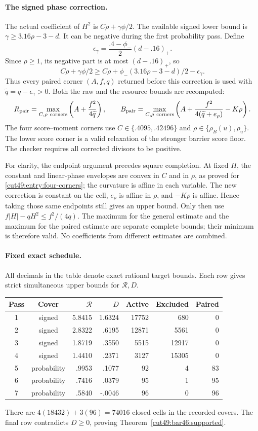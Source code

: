\documentclass[11pt,a4paper]{article}
\numberwithin{equation}{section}
\theoremstyle{definition}
\theoremstyle{remark}
\begin{document}
\paragraph{The signed phase correction.}
The actual coefficient of $H^2$ is $C\rho+\gamma\phi/2$.
The available signed lower bound is $\gamma\ge3.16\rho-3-d$.
It can be negative during the first probability pass. Define
\[
 \epsilon_\gamma=\frac{.4-\phi_-}{2}(d-.16)_+.
\]
Since $\rho\ge1$, its negative part is at most $(d-.16)_+$, so
\begin{equation}\label{cut49:bar46:phase}
 C\rho+\gamma\phi/2
 \ge C\rho+\phi_-(3.16\rho-3-d)/2-\epsilon_\gamma.
\end{equation}
Thus every paired corner $(A,f,q)$ returned before this correction
is used with $\widetilde q=q-\epsilon_\gamma>0$. Both the raw and the
resource bounds are recomputed:
\[
 R_{\rm pair}=\max_{C,\rho\ {\rm corners}}
       \left(A+\frac{f^2}{4\widetilde q}\right),\qquad
 B_{\rm pair}=\max_{C,\rho\ {\rm corners}}
       \left(A+\frac{f^2}{4(\widetilde q+e_\rho)}-K\rho\right).
\]
The four score--moment corners use $C\in\{.4095,.42496\}$ and
$\rho\in\{\rho_B(u),\rho_u\}$. The lower score corner is a valid
relaxation of the stronger barrier score floor. The checker requires
all corrected divisors to be positive.

For clarity, the endpoint argument precedes square completion. At fixed
$H$, the constant and linear-phase envelopes are convex in $C$ and in
$\rho$, as proved for \eqref{cut49:entry:four-corners}; the curvature is affine in each variable.
The new correction is constant on the cell, $e_\rho$ is affine in
$\rho$, and $-K\rho$ is affine. Hence taking those same endpoints
still gives an upper bound. Only then use
$f|H|-qH^2\le f^2/(4q)$. The maximum for the general estimate and the
maximum for the paired estimate are separate complete bounds; their
minimum is therefore valid. No coefficients from different estimates
are combined.

\paragraph{Fixed exact schedule.}
All decimals in the table denote exact rational target bounds. Each
row gives strict simultaneous upper bounds for $\mathcal R,D$.
\begin{center}\small
\begin{tabular}{c|c|r|r|r|r|r}
Pass&Cover&$\mathcal R$&$D$&Active&Excluded&Paired\\\hline
1&signed&5.8415&1.6324&17752&680&0\\
2&signed&2.8322&.6195&12871&5561&0\\
3&signed&1.8719&.3550&5515&12917&0\\
4&signed&1.4410&.2371&3127&15305&0\\
5&probability&.9953&.1077&92&4&83\\
6&probability&.7416&.0379&95&1&95\\
7&probability&.5840&-.0046&96&0&96
\end{tabular}
\end{center}
There are $4(18432)+3(96)=74016$ closed cells in the recorded covers.
The final row contradicts $D\ge0$, proving
Theorem~\ref{cut49:bar46:supported}.
\end{document}
